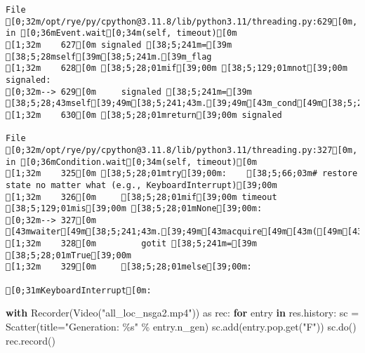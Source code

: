 \documentclass[
  letterpaper,
  DIV=11,
  numbers=noendperiod]{scrartcl}
\newenvironment{Shaded}{\begin{snugshade}}{\end{snugshade}}
\newcommand{\ControlFlowTok}[1]{\textcolor[rgb]{0.00,0.23,0.31}{\textbf{#1}}}
\newcommand{\ImportTok}[1]{\textcolor[rgb]{0.00,0.46,0.62}{#1}}
\newcommand{\KeywordTok}[1]{\textcolor[rgb]{0.00,0.23,0.31}{\textbf{#1}}}
\newcommand{\NormalTok}[1]{\textcolor[rgb]{0.00,0.23,0.31}{#1}}
\newcommand{\OperatorTok}[1]{\textcolor[rgb]{0.37,0.37,0.37}{#1}}
\newcommand{\SpecialCharTok}[1]{\textcolor[rgb]{0.37,0.37,0.37}{#1}}
\newcommand{\StringTok}[1]{\textcolor[rgb]{0.13,0.47,0.30}{#1}}
\begin{document}
\begin{verbatim}
File [0;32m/opt/rye/py/cpython@3.11.8/lib/python3.11/threading.py:629[0m, in [0;36mEvent.wait[0;34m(self, timeout)[0m
[1;32m    627[0m signaled [38;5;241m=[39m [38;5;28mself[39m[38;5;241m.[39m_flag
[1;32m    628[0m [38;5;28;01mif[39;00m [38;5;129;01mnot[39;00m signaled:
[0;32m--> 629[0m     signaled [38;5;241m=[39m [38;5;28;43mself[39;49m[38;5;241;43m.[39;49m[43m_cond[49m[38;5;241;43m.[39;49m[43mwait[49m[43m([49m[43mtimeout[49m[43m)[49m
[1;32m    630[0m [38;5;28;01mreturn[39;00m signaled

File [0;32m/opt/rye/py/cpython@3.11.8/lib/python3.11/threading.py:327[0m, in [0;36mCondition.wait[0;34m(self, timeout)[0m
[1;32m    325[0m [38;5;28;01mtry[39;00m:    [38;5;66;03m# restore state no matter what (e.g., KeyboardInterrupt)[39;00m
[1;32m    326[0m     [38;5;28;01mif[39;00m timeout [38;5;129;01mis[39;00m [38;5;28;01mNone[39;00m:
[0;32m--> 327[0m         [43mwaiter[49m[38;5;241;43m.[39;49m[43macquire[49m[43m([49m[43m)[49m
[1;32m    328[0m         gotit [38;5;241m=[39m [38;5;28;01mTrue[39;00m
[1;32m    329[0m     [38;5;28;01melse[39;00m:

[0;31mKeyboardInterrupt[0m: 
\end{verbatim}

\begin{Shaded}
\begin{Highlighting}[]
\ControlFlowTok{with}\NormalTok{ Recorder(Video(}\StringTok{"all\_loc\_nsga2.mp4"}\NormalTok{)) }\ImportTok{as}\NormalTok{ rec:}
    \ControlFlowTok{for}\NormalTok{ entry }\KeywordTok{in}\NormalTok{ res.history:}
\NormalTok{        sc }\OperatorTok{=}\NormalTok{ Scatter(title}\OperatorTok{=}\StringTok{"Generation: }\SpecialCharTok{\%s}\StringTok{"} \OperatorTok{\%}\NormalTok{ entry.n\_gen)}
\NormalTok{        sc.add(entry.pop.get(}\StringTok{"F"}\NormalTok{))}
\NormalTok{        sc.do()}
\NormalTok{        rec.record()}
\end{Highlighting}
\end{Shaded}
\end{document}

